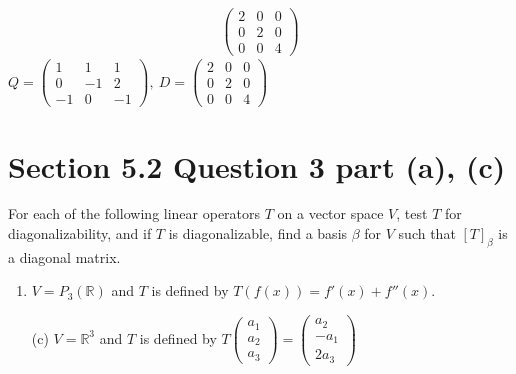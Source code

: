 \documentclass[13pt]{article}
\begin{document}
\begin{enumerate}[label=(\alph*),leftmargin=*]
\begin{align*}
\begin{pmatrix}
          2 & 0 & 0 \\
          0 & 2 & 0 \\
          0 & 0 & 4
        \end{pmatrix}
  \end{align*}
  $Q =
  \begin{pmatrix}
    1 & 1 & 1 \\
    0 & -1 & 2 \\
    -1 & 0 & -1
  \end{pmatrix}, \ D =
  \begin{pmatrix}
    2 & 0 & 0 \\
    0 & 2 & 0 \\
    0 & 0 & 4
  \end{pmatrix}$

\end{enumerate}





\newpage
\section*{Section 5.2 Question 3 part (a), (c)}
For each of the following linear operators $T$ on a vector space $V$, test $T$ for diagonalizability, and if $T$ is diagonalizable, find a basis $\beta$ for $V$ such that $[T]_\beta$ is a diagonal matrix.
\begin{enumerate}[label=(\alph*),leftmargin=*]
\item $V = P_3(\mathbb{R})$ and $T$ is defined by $T(f(x)) = f'(x) + f''(x)$.
\item [(c)] $V = \mathbb{R}^3$ and $T$ is defined by $T
  \begin{pmatrix}
    a_1 \\
    a_2 \\
    a_3
  \end{pmatrix} =
  \begin{pmatrix}
    a_2 \\
    -a_1 \\
    2a_3
  \end{pmatrix}$
\end{enumerate}
\end{document}

